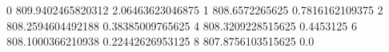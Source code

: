 0 809.9402465820312 2.06463623046875
1 808.6572265625 0.7816162109375
2 808.2594604492188 0.38385009765625
4 808.3209228515625 0.4453125
6 808.1000366210938 0.22442626953125
8 807.8756103515625 0.0
